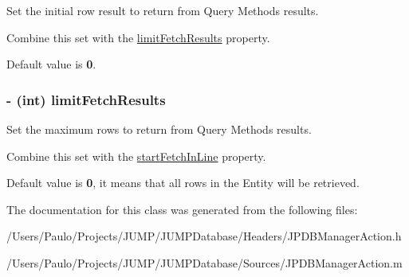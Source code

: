 Set the initial row result to return from Query Methods results. 

Combine this set with the \hyperlink{interface_j_p_d_b_manager_action_a768d19efb483654b753bdc3a8bf1a197}{limitFetchResults} property.\par
 Default value is {\bfseries 0}. \hypertarget{interface_j_p_d_b_manager_action_a768d19efb483654b753bdc3a8bf1a197}{
\subsubsection[{limitFetchResults}]{\setlength{\rightskip}{0pt plus 5cm}-\/ (int) limitFetchResults}}
\label{interface_j_p_d_b_manager_action_a768d19efb483654b753bdc3a8bf1a197}


Set the maximum rows to return from Query Methods results. 

Combine this set with the \hyperlink{interface_j_p_d_b_manager_action_ad679e0229dbddd7d5c87a6348d33fc9e}{startFetchInLine} property.\par
 Default value is {\bfseries 0}, it means that all rows in the Entity will be retrieved. 

The documentation for this class was generated from the following files:\begin{DoxyCompactItemize}
\item 
/Users/Paulo/Projects/JUMP/JUMPDatabase/Headers/JPDBManagerAction.h\item 
/Users/Paulo/Projects/JUMP/JUMPDatabase/Sources/JPDBManagerAction.m\end{DoxyCompactItemize}
